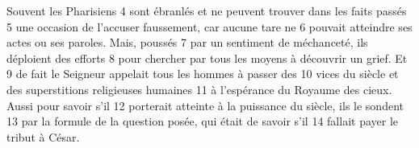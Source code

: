 Souvent les Pharisiens	 
4	 	sont ébranlés et ne peuvent trouver dans les faits passés	 
5	 	une occasion de l'accuser faussement, car aucune tare ne	 
6	 	pouvait atteindre ses actes ou ses paroles. Mais, poussés	 
7	 	par un sentiment de méchanceté, ils déploient des efforts	 
8	 	pour chercher par tous les moyens à découvrir un grief. Et	 
9	 	de fait le Seigneur appelait tous les hommes à passer des	 
10	 	vices du siècle et des superstitions religieuses humaines	 
11	 	à l'espérance du Royaume des cieux. Aussi pour savoir s'il	 
12	 	porterait atteinte à la puissance du siècle, ils le sondent	 
13	 	par la formule de la question posée, qui était de savoir s'il	 
14	 	fallait payer le tribut à César.